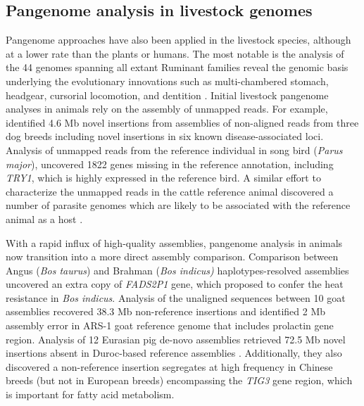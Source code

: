 \documentclass[../main.tex]{subfiles}
\begin{document}
\subsection{Pangenome analysis in livestock genomes}

Pangenome approaches have also been applied in the livestock species, although at a lower rate than the plants or humans. The most notable is the analysis of the 44 genomes spanning all extant Ruminant families reveal the genomic basis underlying the evolutionary innovations such as multi-chambered stomach, headgear, cursorial locomotion, and dentition \citep{chen2019large}. Initial livestock pangenome analyses in animals rely on the assembly of unmapped reads. For example, \citet{holden2018assembly} identified 4.6 Mb novel insertions from assemblies of non-aligned reads from three dog breeds including  novel insertions in six known disease-associated loci. Analysis of unmapped reads from the reference individual in song bird (\emph{Parus major}), \citet{laine2019exploring} uncovered 1822 genes missing in the reference annotation, including \emph{TRY1}, which is highly expressed in the reference bird. A similar effort to characterize the unmapped reads in the cattle reference animal discovered a number of parasite genomes which are likely to be associated with the reference animal as a host \citep{whitacre2015s}. 

With a rapid influx of high-quality assemblies, pangenome analysis in animals now transition into a more direct assembly comparison. Comparison between Angus (\emph{Bos taurus}) and Brahman (\emph{Bos indicus)} haplotypes-resolved assemblies \citep{Low2020} uncovered an extra copy of \emph{FADS2P1} gene, which proposed to confer the heat resistance in \emph{Bos indicus}. Analysis of the unaligned sequences between 10 goat assemblies \citep{li2019towards} recovered 38.3 Mb non-reference insertions and identified 2 Mb assembly error in ARS-1 goat reference genome that includes prolactin gene region. Analysis of 12 Eurasian pig de-novo assemblies retrieved 72.5 Mb novel insertions absent in Duroc-based reference assemblies \citep{li2017comprehensive,tian2019building}. Additionally, they also discovered a non-reference insertion segregates at high frequency in Chinese breeds (but not in European breeds) encompassing the \emph{TIG3} gene region, which is important for fatty acid metabolism. 




\singlespacing
\footnotesize



% 




\ifdefined\BuildingFromMainFile
\else
   
\end{document}

